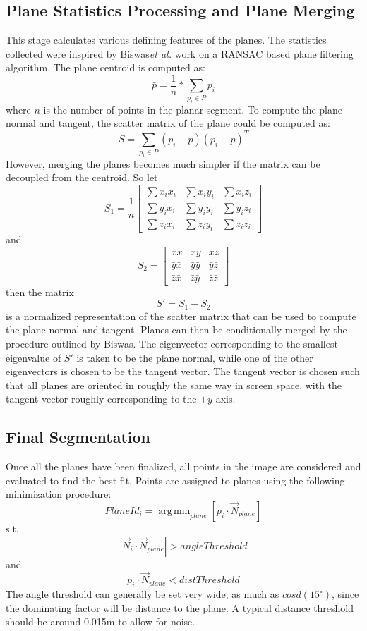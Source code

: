 \subsection{Plane Statistics Processing and Plane Merging}
This stage calculates various defining features of the planes. The statistics collected were inspired by Biswas\textit{et al.} work on a RANSAC based plane filtering algorithm\cite{biswas2012planar}. The plane centroid is computed as: $$\bar{p}=\frac{1}{n}*\sum_{p_i \in P}{p_i}$$ where $n$ is the number of points in the planar segment. To compute the plane normal and tangent, the scatter matrix of the plane could be computed as: $$S = \sum_{p_i \in P}(p_i-\bar{p})(p_i-\bar{p})^T$$
However, merging the planes becomes much simpler if the matrix can be decoupled from the centroid\cite{biswas2012planar}. So let 
$$S_1 = \frac{1}{n}\begin{bmatrix}
  \sum{x_i x_i} & \sum{x_i y_i} & \sum{x_i z_i} \\
  \sum{y_i x_i} & \sum{y_i y_i} & \sum{y_i z_i} \\
  \sum{z_i x_i} & \sum{z_i y_i} & \sum{z_i z_i}
 \end{bmatrix}$$
and
 $$S_2 = \begin{bmatrix}
  \bar{x}\bar{x} & \bar{x}\bar{y} & \bar{x}\bar{z} \\
  \bar{y}\bar{x} & \bar{y}\bar{y} & \bar{y}\bar{z} \\
  \bar{z}\bar{x} & \bar{z}\bar{y} & \bar{z}\bar{z}
 \end{bmatrix}$$
then the matrix
 $$S'=S_1-S_2$$
is a normalized representation of the scatter matrix that can be used to compute the plane normal and tangent. Planes can then be conditionally merged by the procedure outlined by Biswas\cite{biswas2012planar}. 
The eigenvector corresponding to the smallest eigenvalue of $S'$ is taken to be the plane normal, while one of the other eigenvectors is chosen to be the tangent vector. The tangent vector is chosen such that all planes are oriented in roughly the same way in screen space, with the tangent vector roughly corresponding to the $+y$ axis.
\subsection{Final Segmentation}
Once all the planes have been finalized, all points in the image are considered and evaluated to find the best fit. Points are assigned to planes using the following minimization procedure:
$$PlaneId_i = \operatorname{arg\,min}_{plane} [ p_i \cdot \vec{N}_{plane} ]$$ s.t. $$|\vec{N}_i \cdot \vec{N}_{plane}| > angleThreshold$$ and $$p_i \cdot \vec{N}_{plane} < distThreshold$$
The angle threshold can generally be set very wide, as much as $cosd(15^{\circ})$, since the dominating factor will be distance to the plane. A typical distance threshold should be around 0.015m to allow for noise.

